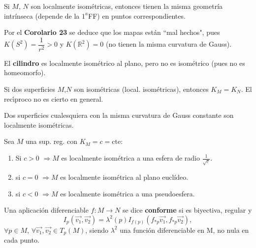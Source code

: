 \documentclass[twoside]{report}
\begin{document}
\begin{coro}
Si  $M$, $N$ son localmente isom\'etricas, entonces tienen la misma geometr\'ia intr\'inseca (depende de la $1^a$FF) en puntos correspondientes.
%
\end{coro}

\begin{nota}
Por el \textbf{Corolario 23} se deduce que los mapas est\'an ``mal hechos", pues $K(S^2)= \dfrac{1}{r^2} >0$ y $K(\mathbb{R}^2)=0$ (no tienen la misma curvatura de Gauss).
\end{nota}

\begin{ej}
El \textbf{cilindro} es localmente isom\'etrico al plano, pero no es isom\'etrico (pues no es homeomorfo).
\end{ej}

\begin{nota}
Si dos superficies $M$,$N$ son isom\'etricas (local. isom\'etricas), entonces $K_M = K_N$.
El rec\'{\i}proco no es cierto en general.
\end{nota}

\begin{teorema}
Dos superficies cualesquiera con la misma curvatura de Gauss constante son localmente isom\'etricas.

\end{teorema}

\begin{coro}
Sea $M$ una sup. reg. con $K_M=c=$cte:
\begin{enumerate}
\item Si $c>0$ $\Rightarrow M$ es localmente isom\'etrica a una esfera de radio $\frac{1}{\sqrt{c}}$.

\item si $c=0$ $\Rightarrow M$ es localmente isom\'etrica al plano eucl\'ideo.

\item si $c<0$ $\Rightarrow M$ es localmente isom\'etrica a una pseudoesfera.

\end{enumerate}
\end{coro}

\begin{defi}
Una aplicaci\'on diferenciable $f: M \longrightarrow N$ se dice \textbf{conforme} si es biyectiva, regular y $$I_p (\overrightarrow{v_1},\overrightarrow{v_2}) = \lambda^2(p)I_{f(p)}(f_{*p}\overrightarrow{v_1},f_{*p}\overrightarrow{v_2}),$$ $\forall p \in M$, $\forall \overrightarrow{v_1},\overrightarrow{v_2} \in T_p(M)$, siendo $\lambda^2$ una funci\'on diferenciable en M, no nula en cada punto.
\end{defi}
\end{document}
